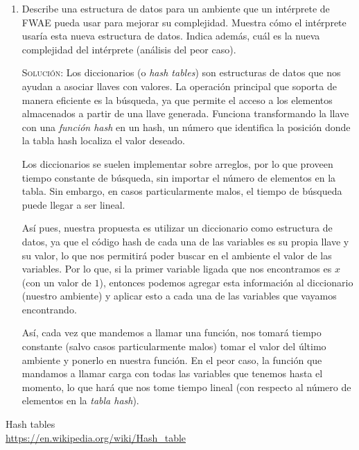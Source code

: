 \documentclass[letterpaper,11pt]{article}
\begin{document}
\begin{enumerate}
\begin{enumerate}
        \item Describe una estructura de datos para un ambiente que un 
        intérprete de FWAE pueda usar para mejorar su complejidad. Muestra 
        cómo el intérprete usaría esta nueva estructura de datos. Indica 
        además, cuál es la nueva complejidad del intérprete (análisis del 
        peor caso).

        \textsc{Solución:} Los diccionarios (o \textit{hash tables}) son 
        estructuras de datos que nos ayudan a asociar llaves con valores. 
        La operación principal que soporta de manera eficiente es la 
        búsqueda, ya que permite el acceso a los elementos almacenados a partir 
        de una llave generada. Funciona transformando la llave con una 
        \textit{función hash} en un hash, un número que identifica la posición 
        donde la tabla hash localiza el valor deseado. 

        Los diccionarios se suelen implementar sobre arreglos, por lo que proveen
        tiempo constante de búsqueda, sin importar el número de elementos en la
        tabla. Sin embargo, en casos particularmente malos, el tiempo de búsqueda 
        puede llegar a ser lineal.

        Así pues, nuestra propuesta es utilizar un diccionario como estructura 
        de datos, ya que el código hash de cada una de las variables es su 
        propia llave y su valor, lo que nos permitirá poder buscar en el 
        ambiente el valor de las variables. Por lo que, si la primer variable 
        ligada que nos encontramos es $x$ (con un valor de $1$), entonces 
        podemos agregar esta información al diccionario (nuestro ambiente) y 
        aplicar esto a cada una de las variables que vayamos encontrando.

        Así, cada vez que mandemos a llamar una función, nos tomará tiempo 
        constante (salvo casos particularmente malos) tomar el valor del último 
        ambiente y ponerlo en nuestra función. En el peor caso, la función que 
        mandamos a llamar carga con todas las variables que tenemos hasta el 
        momento, lo que hará que nos tome tiempo lineal (con respecto al número 
        de elementos en la \textit{tabla hash}).

   \end{enumerate}
\end{enumerate}

\begin{thebibliography}{2}
  Hash tables \\
  \url{https://en.wikipedia.org/wiki/Hash_table}
\end{thebibliography}
\end{document}
